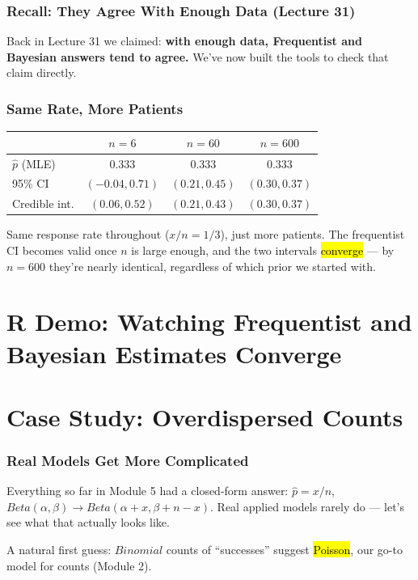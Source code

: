 \documentclass[slidestop,compress,mathserif]{beamer}
\begin{document}
\begin{frame}
    \frametitle{Recall: They Agree With Enough Data (Lecture 31)}
    Back in Lecture 31 we claimed: \textbf{with enough data, Frequentist and Bayesian answers tend to agree.} We've now built the tools to check that claim directly.
    \pause
    \medskip
\end{frame}

\begin{frame}
    \frametitle{Same Rate, More Patients}
    \begin{center}
    \small
    \renewcommand{\arraystretch}{1.3}
    \begin{tabular}{l c c c}
    \toprule
     & $n=6$ & $n=60$ & $n=600$ \\
    \midrule
    $\hat{p}$ (MLE) & $0.333$ & $0.333$ & $0.333$ \\
    95\% CI & \textcolor{rubineRed}{$(-0.04, 0.71)$} & $(0.21, 0.45)$ & $(0.30, 0.37)$ \\
    Credible int. & $(0.06, 0.52)$ & $(0.21, 0.43)$ & $(0.30, 0.37)$ \\
    \bottomrule
    \end{tabular}
    \end{center}
    \pause
    \medskip
    Same response rate throughout ($x/n=1/3$), just more patients. The frequentist CI becomes valid once $n$ is large enough, and the two intervals \hl{converge} --- by $n=600$ they're nearly identical, regardless of which prior we started with.
\end{frame}

\section{R Demo: Watching Frequentist and Bayesian Estimates Converge}


\section{Case Study: Overdispersed Counts}

\begin{frame}
    \frametitle{Real Models Get More Complicated}
    Everything so far in Module 5 had a closed-form answer: $\hat{p}=x/n$, $Beta(\alpha,\beta)\to Beta(\alpha+x,\beta+n-x)$. Real applied models rarely do --- let's see what that actually looks like.
    \pause

    \medskip
    \pause

    \medskip
    A natural first guess: $Binomial$ counts of ``successes'' suggest \hl{Poisson}, our go-to model for counts (Module 2).
\end{frame}
\end{document}
